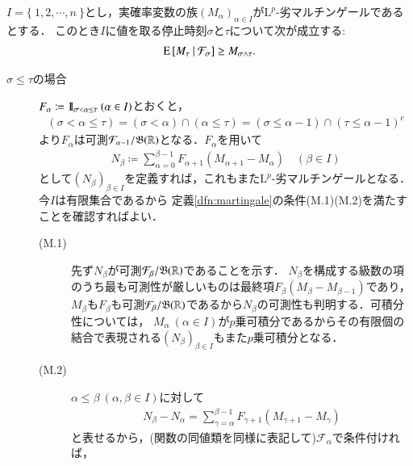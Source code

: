 	\begin{itembox}[l]{}
		\begin{thm}[任意抽出定理(その1)]
			$I = \{\ 1,2,\cdots,n\ \}$とし，実確率変数の族$(M_\alpha)_{\alpha \in I}$が$\mathrm{L}^p$-劣マルチンゲールであるとする．
			このとき$I$に値を取る停止時刻$\sigma$と$\tau$について次が成立する:
			\begin{align}
				\operatorname{E} \left[ M_\tau \ \middle|\ \mathcal{F}_\sigma \right] \geq M_{\sigma \wedge \tau}.
			\end{align}
		\end{thm}
	\end{itembox}
	
	\begin{prf}\mbox{}
		\begin{description}
			\item[$\sigma \leq \tau$の場合]
				$F_\alpha \coloneqq \mbox{1}\hspace{-0.25em}\mbox{l}_{\sigma < \alpha \leq \tau}\ (\alpha \in I)$とおくと，
				\begin{align}
					(\sigma < \alpha \leq \tau) = (\sigma < \alpha) \cap (\alpha \leq \tau) = (\sigma \leq \alpha-1) \cap (\tau \leq \alpha-1)^c
				\end{align}
				より$F_\alpha$は可測$\mathcal{F}_{\alpha-1}/\mathfrak{B}(\mathbb{R})$となる．$F_\alpha$を用いて
				\begin{align}
					N_\beta \coloneqq \sum_{\alpha=0}^{\beta-1} F_{\alpha+1}(M_{\alpha+1} - M_\alpha) \quad (\beta \in I)
				\end{align}
				として$(N_\beta)_{\beta \in I}$を定義すれば，これもまた$\mathrm{L}^p$-劣マルチンゲールとなる．今$I$は有限集合であるから
				定義\ref{dfn:martingale}の条件(M.1)(M.2)を満たすことを確認すればよい．
				\begin{description}
					\item[(M.1)] 先ず$N_\beta$が可測$\mathcal{F}_\beta/\mathfrak{B}(\mathbb{R})$であることを示す．
						$N_\beta$を構成する級数の項のうち最も可測性が厳しいものは最終項$F_{\beta}(M_{\beta} - M_{\beta-1})$であり，
						$M_\beta$も$F_{\beta}$も可測$\mathcal{F}_\beta/\mathfrak{B}(\mathbb{R})$であるから$N_\beta$の可測性も判明する．可積分性については，
						$M_\alpha\ (\alpha \in I)$が$p$乗可積分であるからその有限個の結合で表現される$(N_\beta)_{\beta \in I}$もまた$p$乗可積分となる．
					\item[(M.2)]	
						$\alpha \leq \beta\ (\alpha,\beta \in I)$に対して
						\begin{align}
							N_{\beta} - N_{\alpha} = \sum_{\gamma=\alpha}^{\beta-1} F_{\gamma+1}(M_{\gamma+1} - M_\gamma)
						\end{align}
						と表せるから，(関数の同値類を同様に表記して)$\mathcal{F}_{\alpha}$で条件付ければ，

\end{description}
\end{description}
\end{prf}
